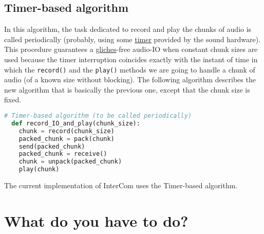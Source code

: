\subsection{Timer-based algorithm}

In this algorithm, the task dedicated to record and play the chunks of
audio is called periodically (probably, using some
\href{https://en.wikipedia.org/wiki/Timer}{timer} provided by the
sound hardware). This procedure guarantees a
\href{https://en.wikipedia.org/wiki/Glitch}{gliches}-free audio-IO
when constant chunk sizes are used because the timer interruption
coincides exactly with the instant of time in which the
\verb|record()| and the \verb|play()| methods we are going to handle a
chunk of audio (of a known size without blocking). The following
algorithm describes the new algorithm that is basically the previous
one, except that the chunk size is fixed.

\begin{lstlisting}[language=Python]
  # Timer-based algorithm (to be called periodically)
  def record_IO_and_play(chunk_size):
    chunk = record(chunk_size)
    packed_chunk = pack(chunk)
    send(packed_chunk)
    packed_chunk = receive()
    chunk = unpack(packed_chunk)
    play(chunk)
\end{lstlisting}


The current implementation of InterCom uses the Timer-based algorithm.

\section{What do you have to do?}

